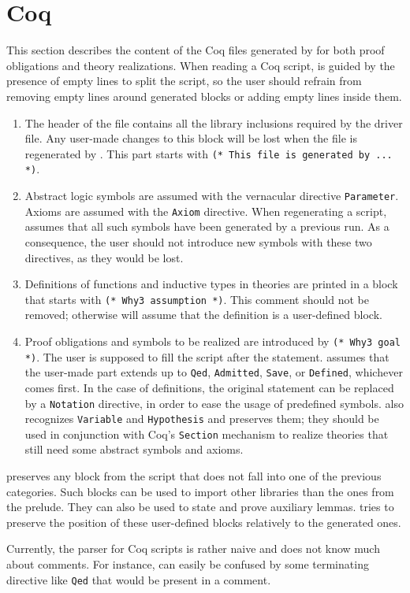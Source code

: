 
\section{Coq}
\label{sec:coq}

This section describes the content of the Coq files generated by \why for
both proof obligations and theory realizations. When reading a Coq
script, \why is guided by the presence of empty lines to split the
script, so the user should refrain from removing empty lines around
generated blocks or adding empty lines inside them.

\begin{enumerate}
\item	The header of the file contains all the library inclusions
	required by the driver file. Any user-made changes to this block
	will be lost when the file is regenerated by \why. This part
        starts with \verb+(* This file is generated by ... *)+.
\item	Abstract logic symbols are assumed with the vernacular directive
	\verb+Parameter+. Axioms are assumed with the \verb+Axiom+
	directive. When regenerating a script, \why assumes that all such
	symbols have been generated by a previous run. As a consequence,
	the user should not introduce new symbols with these two
	directives, as they would be lost.
\item	Definitions of functions and inductive types in theories are
	printed in a block that starts with \verb+(* Why3 assumption *)+.
	This comment should not be removed; otherwise \why will assume
	that the definition is a user-defined block.
\item	Proof obligations and symbols to be realized are
	introduced by \verb+(* Why3 goal *)+. The user is supposed to
	fill the script after the statement. \why assumes that the
	user-made part extends up to \verb+Qed+, \verb+Admitted+,
	\verb+Save+, or \verb+Defined+, whichever comes first. In the
	case of definitions, the original statement can be replaced by
	a \verb+Notation+ directive, in order to ease the usage of
	predefined symbols. \why also recognizes \verb+Variable+
	and \verb+Hypothesis+ and preserves them; they should be used in
	conjunction with Coq's \verb+Section+ mechanism to realize
	theories that still need some abstract symbols and axioms.
\end{enumerate}

\why preserves any block from the script that does not fall into one of
the previous categories. Such blocks can be used to import other
libraries than the ones from the prelude. They can also be used to state
and prove auxiliary lemmas. \why tries to preserve the position of these
user-defined blocks relatively to the generated ones.

Currently, the parser for Coq scripts is rather naive and does not know
much about comments. For instance, \why can easily be confused by
some terminating directive like \verb+Qed+ that would be present in a
comment.


